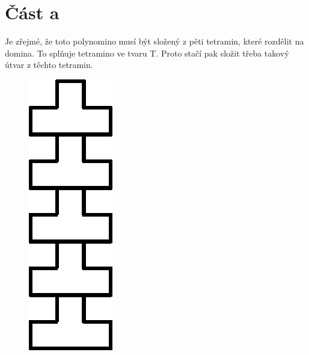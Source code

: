 \documentclass{fkssolpub}
\author{Ondřej Sedláček}
\begin{document}
\section{Část a}

Je zřejmé, že toto polynomino musí být složený z pěti tetramin, které
rozdělit na domina. To splňuje tetramino ve tvaru T. Proto stačí pak složit
třeba takový útvar z těchto tetramin.

\begin{figure}[h!]
	\begin{center}
		\includegraphics[height=0.25\textheight]{tetris}
	\end{center}
	\caption{}
	\label{fig:a}
\end{figure}
\end{document}

